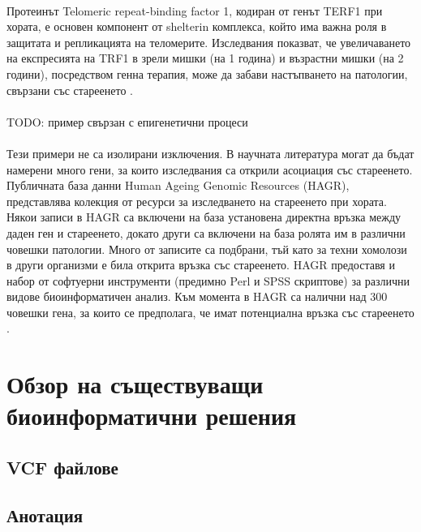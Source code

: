 \documentclass[pdftex,cyrillic,14pt,a4page,twoside]{extreport}
\begin{document}
\paragraph{}
Протеинът Telomeric repeat-binding factor 1, кодиран от генът TERF1 при хората, е основен компонент от shelterin комплекса, който има важна роля в защитата и репликацията на теломерите. Изследвания показват, че увеличаването на експресията на TRF1 в зрели мишки (на 1 година) и възрастни мишки (на 2 години), посредством генна терапия, може да забави настъпването на патологии, свързани със стареенето \cite{derevyanko2017}.

\paragraph{}
TODO: пример свързан с епигенетични процеси

\paragraph{}
Тези примери не са изолирани изключения. В научната литература могат да бъдат намерени много гени, за които изследвания са открили асоциация със стареенето. Публичната база данни Human Ageing Genomic Resources (HAGR), представлява колекция от ресурси за изследването на стареенето при хората. Някои записи в HAGR са включени на база установена директна връзка между даден ген и стареенето, докато други са включени на база ролята им в различни човешки патологии. Много от записите са подбрани, тъй като за техни хомолози в други организми е била открита връзка със стареенето. HAGR предоставя и набор от софтуерни инструменти (предимно Perl и SPSS скриптове) за различни видове биоинформатичен анализ. Към момента в HAGR са налични над 300 човешки гена, за които се предполага, че имат потенциална връзка със стареенето \cite{tacutu2018}.
 
\section[Обзор на съществуващи биоинформатични решения]{Обзор на съществуващи\\ биоинформатични решения}
\subsection{VCF файлове}

\subsection{Анотация}
\end{document}
